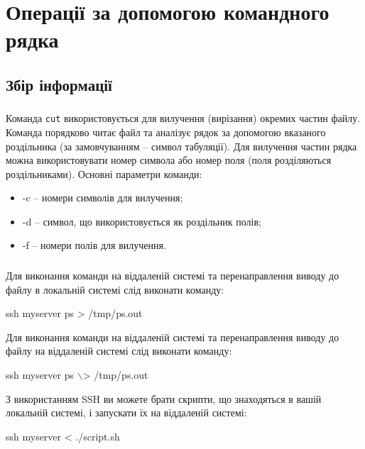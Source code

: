 \documentclass[t]{beamer}  %
\begin{document}
\section{Операції за допомогою командного рядка}
\subsection{Збір інформації}

\begin{frame}
  \frametitle{\insertsection} 
	\framesubtitle{\insertsubsection}
Команда \texttt{cut} використовується для вилучення (вирізання) окремих частин файлу. Команда порядково читає файл та аналізує рядок за допомогою вказаного роздільника (за замовчуванням -- символ табуляції). Для вилучення частин рядка можна використовувати номер символа або номер поля (поля розділяються роздільниками). Основні параметри команди:
\begin{itemize}
  \item -c -- номери символів для вилучення;
  \item -d -- символ, що використовується як роздільник полів;
  \item -f -- номери полів для вилучення.
\end{itemize}
\end{frame}

\begin{frame}
  \frametitle{\insertsection} 
	\framesubtitle{\insertsubsection}
Для виконання команди на віддаленій системі та перенаправлення виводу до файлу в локальній системі слід виконати команду:

ssh myserver ps > /tmp/ps.out

Для виконання команди на віддаленій системі та перенаправлення виводу до файлу на віддаленій системі слід виконати команду:

ssh myserver ps $\backslash$> /tmp/ps.out 

З використанням SSH ви можете брати скрипти, що знаходяться в вашій локальній системі, і запускати їх на віддаленій системі:

ssh myserver < ./script.sh    
	
\end{frame}
\end{document}
